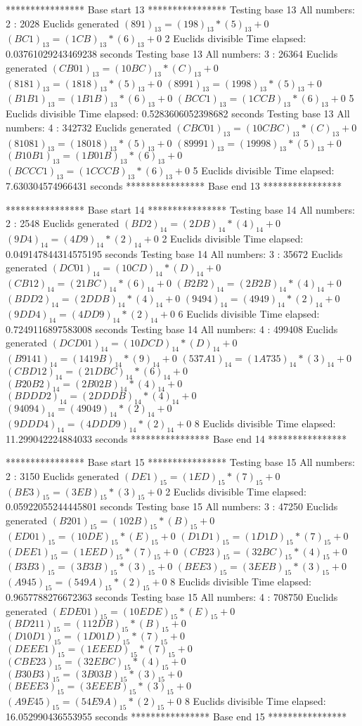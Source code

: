 **************** Base start 13 ****************
Testing base 13 All numbers: 2 :
	 2028 Euclids generated
	$(891)_{13}=(198)_{13}*(5)_{13}+0$
	$(BC1)_{13}=(1CB)_{13}*(6)_{13}+0$
	 2 Euclids divisible
Time elapsed: 0.03761029243469238 seconds
Testing base 13 All numbers: 3 :
	 26364 Euclids generated
	$(CB01)_{13}=(10BC)_{13}*(C)_{13}+0$
	$(8181)_{13}=(1818)_{13}*(5)_{13}+0$
	$(8991)_{13}=(1998)_{13}*(5)_{13}+0$
	$(B1B1)_{13}=(1B1B)_{13}*(6)_{13}+0$
	$(BCC1)_{13}=(1CCB)_{13}*(6)_{13}+0$
	 5 Euclids divisible
Time elapsed: 0.5283606052398682 seconds
Testing base 13 All numbers: 4 :
	 342732 Euclids generated
	$(CBC01)_{13}=(10CBC)_{13}*(C)_{13}+0$
	$(81081)_{13}=(18018)_{13}*(5)_{13}+0$
	$(89991)_{13}=(19998)_{13}*(5)_{13}+0$
	$(B10B1)_{13}=(1B01B)_{13}*(6)_{13}+0$
	$(BCCC1)_{13}=(1CCCB)_{13}*(6)_{13}+0$
	 5 Euclids divisible
Time elapsed: 7.630304574966431 seconds
**************** Base end 13 ****************

**************** Base start 14 ****************
Testing base 14 All numbers: 2 :
	 2548 Euclids generated
	$(BD2)_{14}=(2DB)_{14}*(4)_{14}+0$
	$(9D4)_{14}=(4D9)_{14}*(2)_{14}+0$
	 2 Euclids divisible
Time elapsed: 0.049147844314575195 seconds
Testing base 14 All numbers: 3 :
	 35672 Euclids generated
	$(DC01)_{14}=(10CD)_{14}*(D)_{14}+0$
	$(CB12)_{14}=(21BC)_{14}*(6)_{14}+0$
	$(B2B2)_{14}=(2B2B)_{14}*(4)_{14}+0$
	$(BDD2)_{14}=(2DDB)_{14}*(4)_{14}+0$
	$(9494)_{14}=(4949)_{14}*(2)_{14}+0$
	$(9DD4)_{14}=(4DD9)_{14}*(2)_{14}+0$
	 6 Euclids divisible
Time elapsed: 0.7249116897583008 seconds
Testing base 14 All numbers: 4 :
	 499408 Euclids generated
	$(DCD01)_{14}=(10DCD)_{14}*(D)_{14}+0$
	$(B9141)_{14}=(1419B)_{14}*(9)_{14}+0$
	$(537A1)_{14}=(1A735)_{14}*(3)_{14}+0$
	$(CBD12)_{14}=(21DBC)_{14}*(6)_{14}+0$
	$(B20B2)_{14}=(2B02B)_{14}*(4)_{14}+0$
	$(BDDD2)_{14}=(2DDDB)_{14}*(4)_{14}+0$
	$(94094)_{14}=(49049)_{14}*(2)_{14}+0$
	$(9DDD4)_{14}=(4DDD9)_{14}*(2)_{14}+0$
	 8 Euclids divisible
Time elapsed: 11.299042224884033 seconds
**************** Base end 14 ****************

**************** Base start 15 ****************
Testing base 15 All numbers: 2 :
	 3150 Euclids generated
	$(DE1)_{15}=(1ED)_{15}*(7)_{15}+0$
	$(BE3)_{15}=(3EB)_{15}*(3)_{15}+0$
	 2 Euclids divisible
Time elapsed: 0.05922055244445801 seconds
Testing base 15 All numbers: 3 :
	 47250 Euclids generated
	$(B201)_{15}=(102B)_{15}*(B)_{15}+0$
	$(ED01)_{15}=(10DE)_{15}*(E)_{15}+0$
	$(D1D1)_{15}=(1D1D)_{15}*(7)_{15}+0$
	$(DEE1)_{15}=(1EED)_{15}*(7)_{15}+0$
	$(CB23)_{15}=(32BC)_{15}*(4)_{15}+0$
	$(B3B3)_{15}=(3B3B)_{15}*(3)_{15}+0$
	$(BEE3)_{15}=(3EEB)_{15}*(3)_{15}+0$
	$(A945)_{15}=(549A)_{15}*(2)_{15}+0$
	 8 Euclids divisible
Time elapsed: 0.9657788276672363 seconds
Testing base 15 All numbers: 4 :
	 708750 Euclids generated
	$(EDE01)_{15}=(10EDE)_{15}*(E)_{15}+0$
	$(BD211)_{15}=(112DB)_{15}*(B)_{15}+0$
	$(D10D1)_{15}=(1D01D)_{15}*(7)_{15}+0$
	$(DEEE1)_{15}=(1EEED)_{15}*(7)_{15}+0$
	$(CBE23)_{15}=(32EBC)_{15}*(4)_{15}+0$
	$(B30B3)_{15}=(3B03B)_{15}*(3)_{15}+0$
	$(BEEE3)_{15}=(3EEEB)_{15}*(3)_{15}+0$
	$(A9E45)_{15}=(54E9A)_{15}*(2)_{15}+0$
	 8 Euclids divisible
Time elapsed: 16.052990436553955 seconds
**************** Base end 15 ****************


